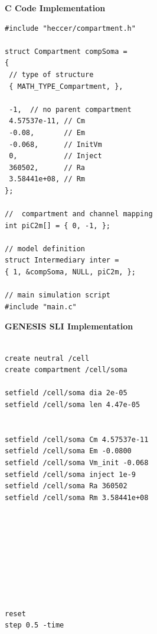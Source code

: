 \documentclass[10pt]{article}
\begin{document}
{ 
\vspace*{1mm} 
\begin{minipage}{1\linewidth}
    
\begin{minipage}[t]{.50\linewidth}
\vspace*{1mm}

{\bf C Code Implementation}
\begin{verbatim}
#include "heccer/compartment.h"

struct Compartment compSoma =
{
 // type of structure
 { MATH_TYPE_Compartment, },

 -1,  // no parent compartment
 4.57537e-11, // Cm
 -0.08,       // Em
 -0.068,      // InitVm
 0,           // Inject
 360502,      // Ra
 3.58441e+08, // Rm
};

//  compartment and channel mapping
int piC2m[] = { 0, -1, };

// model definition
struct Intermediary inter =
{ 1, &compSoma, NULL, piC2m, };

// main simulation script
#include "main.c"

\end{verbatim}
\end{minipage}
\vspace*{2mm} 
\begin{minipage}[t]{.50\linewidth}
\vspace*{1mm} 

{\bf GENESIS SLI Implementation}
\begin{verbatim}

create neutral /cell
create compartment /cell/soma

setfield /cell/soma dia 2e-05
setfield /cell/soma len 4.47e-05


setfield /cell/soma Cm 4.57537e-11
setfield /cell/soma Em -0.0800
setfield /cell/soma Vm_init -0.068
setfield /cell/soma inject 1e-9
setfield /cell/soma Ra 360502
setfield /cell/soma Rm 3.58441e+08









reset
step 0.5 -time
\end{verbatim}
    \end{minipage}
  \end{minipage}
    \vspace*{1mm}
}
\end{document}
